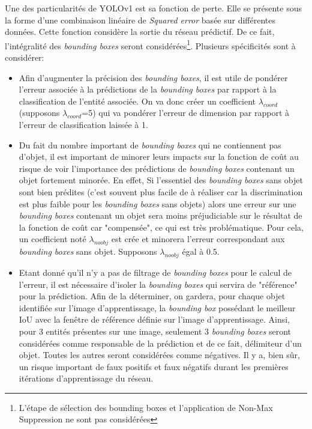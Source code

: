 \noindent Une des particularités de YOLOv1 est sa fonction de perte. Elle se présente sous la forme d'une combinaison linéaire de \textit{Squared error} basée sur différentes données. Cette fonction considère la sortie du réseau prédictif. De ce fait, l'intégralité des \textit{bounding boxes} seront considérées\footnote{L'étape de sélection des bounding boxes et l'application de Non-Max Suppression ne sont pas considérées}. Plusieurs spécificités sont à considérer:
\begin{itemize}
    \item Afin d'augmenter la précision des \textit{bounding boxes}, il est utile de pondérer l'erreur associée à la prédictions de la \textit{bounding boxes} par rapport à la classification de l'entité associée. On va donc créer un coefficient $\lambda_{coord}$ (supposons $\lambda_{coord}$=5) qui va pondérer l'erreur de dimension par rapport à l'erreur de classification laissée à 1.

    \item Du fait du nombre important de \textit{bounding boxes} qui ne contiennent pas d'objet, il est important de minorer leurs impacts sur la fonction de coût au risque de voir l'importance des prédictions de \textit{bounding boxes} contenant un objet fortement minorée. En effet, Si l'essentiel des \textit{bounding boxes} sans objet sont bien prédites (c'est souvent plus facile de à réaliser car la discrimination est plus faible pour les \textit{bounding boxes} sans objets) alors une erreur sur une \textit{bounding boxes} contenant un objet sera moins préjudiciable sur le résultat de la fonction de coût car "compensée", ce qui est très problématique. Pour cela, un coefficient noté $\lambda_{noobj}$ est crée et minorera l'erreur correspondant aux \textit{bounding boxes} sans objet. Supposons $\lambda_{noobj}$ égal à 0.5.

    \item Etant donné qu'il n'y a pas de filtrage de \textit{bounding boxes} pour le calcul de l'erreur, il est nécessaire d'isoler la \textit{bounding boxes} qui servira de "référence" pour la prédiction. Afin de la déterminer, on gardera, pour chaque objet identifiée sur l'image d'apprentissage, la \textit{bounding box} possédant le meilleur IoU avec la fenêtre de référence définie sur l'image d'apprentissage. Ainsi, pour 3 entités présentes sur une image, seulement 3 \textit{bounding boxes} seront considérées comme responsable de la prédiction et de ce fait, délimiteur d'un objet. Toutes les autres seront considérées comme négatives. Il y a, bien sûr, un risque important de faux positifs et faux négatifs durant les premières itérations d'apprentissage du réseau.


\end{itemize}
